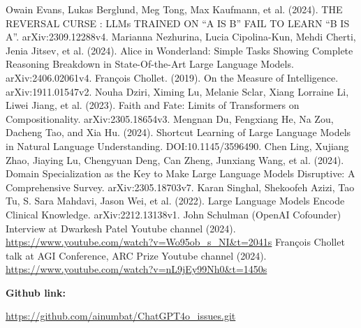 \documentclass[11pt]{scrartcl}
\begin{document}
\begin{thebibliography}{9}  %

	Owain Evans, Lukas Berglund, Meg Tong, Max Kaufmann, et al. (2024). THE REVERSAL CURSE : LLMs TRAINED ON “A IS B” FAIL TO LEARN “B IS A”. arXiv:2309.12288v4.      
    Marianna Nezhurina, Lucia Cipolina-Kun, Mehdi Cherti, Jenia Jitsev, et al. (2024). Alice in Wonderland: Simple Tasks Showing Complete Reasoning Breakdown in State-Of-the-Art Large Language Models. arXiv:2406.02061v4.
    François Chollet. (2019). On the Measure of Intelligence. arXiv:1911.01547v2.
    Nouha Dziri, Ximing Lu, Melanie Sclar, Xiang Lorraine Li, Liwei Jiang, et al. (2023). Faith and Fate: Limits of Transformers on Compositionality. arXiv:2305.18654v3.
    Mengnan Du, Fengxiang He, Na Zou, Dacheng Tao, and Xia Hu. (2024). Shortcut Learning of Large Language Models in Natural Language Understanding. DOI:10.1145/3596490.
    Chen Ling, Xujiang Zhao, Jiaying Lu, Chengyuan Deng, Can Zheng, Junxiang Wang, et al. (2024). Domain Specialization as the Key to Make Large Language Models Disruptive: A Comprehensive Survey. arXiv:2305.18703v7.
	Karan Singhal, Shekoofeh Azizi, Tao Tu, S. Sara Mahdavi, Jason Wei, et al. (2022). Large Language Models Encode Clinical Knowledge. arXiv:2212.13138v1.
	John Schulman (OpenAI Cofounder) Interview at Dwarkesh Patel Youtube channel (2024). \url{https://www.youtube.com/watch?v=Wo95ob_s_NI&t=2041s}
	François Chollet talk at AGI Conference, ARC Prize Youtube channel (2024). \url{https://www.youtube.com/watch?v=nL9jEy99Nh0&t=1450s}
    
\end{thebibliography}

\vspace{1cm}

\begin{large}
\textbf{Github link:} 
\end{large}
\url{https://github.com/ainumbat/ChatGPT4o_issues.git}
\end{document}
